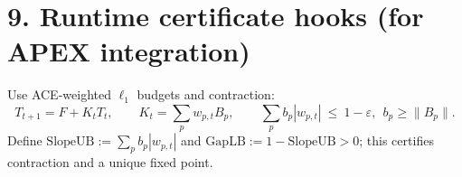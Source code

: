 \documentclass[11pt]{article}
\begin{document}
\section*{9. Runtime certificate hooks (for APEX integration)}
Use ACE-weighted $\ell_1$ budgets and contraction:
\begin{equation*}
T_{t+1}=F+K_t T_t,\qquad K_t=\sum_{p} w_{p,t} B_p,\qquad 
\sum_p b_p |w_{p,t}|\ \le\ 1-\varepsilon,\ \ b_p\ge\lVert B_p\rVert.
\end{equation*}
Define $\mathrm{SlopeUB}:=\sum_p b_p|w_{p,t}|$ and $\mathrm{GapLB}:=1-\mathrm{SlopeUB}>0$; this certifies contraction and a unique fixed point.
\end{document}
